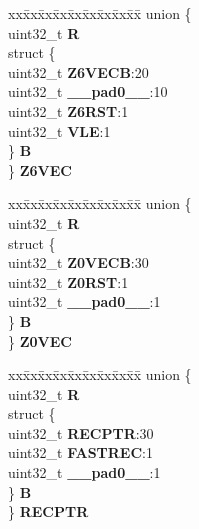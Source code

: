 \begin{DoxyCompactItemize}
\begin{tabbing}
\end{tabbing}\item 
\mbox{\label{structCRP__tag_a9fc28935e5a0cdd0bc5144ef62df00f1}} 
\begin{tabbing}
xx\=xx\=xx\=xx\=xx\=xx\=xx\=xx\=xx\=\kill
union \{\\
\>uint32\_t {\bfseries R}\\
\>struct \{\\
\>\>uint32\_t {\bfseries Z6VECB}:20\\
\>\>uint32\_t {\bfseries \_\_pad0\_\_}:10\\
\>\>uint32\_t {\bfseries Z6RST}:1\\
\>\>uint32\_t {\bfseries VLE}:1\\
\>\} {\bfseries B}\\
\} {\bfseries Z6VEC}\\

\end{tabbing}\item 
\mbox{\label{structCRP__tag_a259ccec75c21def001a6da9e97d87209}} 
\begin{tabbing}
xx\=xx\=xx\=xx\=xx\=xx\=xx\=xx\=xx\=\kill
union \{\\
\>uint32\_t {\bfseries R}\\
\>struct \{\\
\>\>uint32\_t {\bfseries Z0VECB}:30\\
\>\>uint32\_t {\bfseries Z0RST}:1\\
\>\>uint32\_t {\bfseries \_\_pad0\_\_}:1\\
\>\} {\bfseries B}\\
\} {\bfseries Z0VEC}\\

\end{tabbing}\item 
\mbox{\label{structCRP__tag_a61d275923534d7d4f921909efbe9ddbf}} 
\begin{tabbing}
xx\=xx\=xx\=xx\=xx\=xx\=xx\=xx\=xx\=\kill
union \{\\
\>uint32\_t {\bfseries R}\\
\>struct \{\\
\>\>uint32\_t {\bfseries RECPTR}:30\\
\>\>uint32\_t {\bfseries FASTREC}:1\\
\>\>uint32\_t {\bfseries \_\_pad0\_\_}:1\\
\>\} {\bfseries B}\\
\} {\bfseries RECPTR}\\


\end{tabbing}
\end{DoxyCompactItemize}
